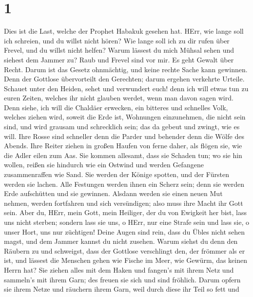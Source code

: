 \hypertarget{section}{%
\section{1}\label{section}}

 Dies ist die Last, welche der Prophet Habakuk gesehen hat.
 HErr, wie lange soll ich schreien, und du willst nicht
hören? Wie lange soll ich zu dir rufen über Frevel, und du willst nicht
helfen?  Warum lässest du mich Mühsal sehen und siehest dem
Jammer zu? Raub und Frevel sind vor mir. Es geht Gewalt über Recht.
 Darum ist das Gesetz ohnmächtig, und keine rechte Sache
kann gewinnen. Denn der Gottlose übervorteilt den Gerechten; darum
ergehen verkehrte Urteile.  Schauet unter den Heiden, sehet
und verwundert euch! denn ich will etwas tun zu euren Zeiten, welches
ihr nicht glauben werdet, wenn man davon sagen wird.  Denn
siehe, ich will die Chaldäer erwecken, ein bitteres und schnelles Volk,
welches ziehen wird, soweit die Erde ist, Wohnungen einzunehmen, die
nicht sein sind,  und wird grausam und schrecklich sein; das
da gebeut und zwingt, wie es will.  Ihre Rosse sind
schneller denn die Parder und behender denn die Wölfe des Abends. Ihre
Reiter ziehen in großen Haufen von ferne daher, als flögen sie, wie die
Adler eilen zum Aas.  Sie kommen allesamt, dass sie Schaden
tun; wo sie hin wollen, reißen sie hindurch wie ein Ostwind und werden
Gefangene zusammenraffen wie Sand.  Sie werden der Könige
spotten, und der Fürsten werden sie lachen. Alle Festungen werden ihnen
ein Scherz sein; denn sie werden Erde aufschütten und sie gewinnen.
 Alsdann werden sie einen neuen Mut nehmen, werden
fortfahren und sich versündigen; also muss ihre Macht ihr Gott sein.
 Aber du, HErr, mein Gott, mein Heiliger, der du von
Ewigkeit her bist, lass uns nicht sterben; sondern lass sie uns, o HErr,
nur eine Strafe sein und lass sie, o unser Hort, uns nur züchtigen!
 Deine Augen sind rein, dass du Übles nicht sehen magst,
und dem Jammer kannst du nicht zusehen. Warum siehst du denn den Räubern
zu und schweigst, dass der Gottlose verschlingt den, der frömmer als er
ist,  und lässest die Menschen gehen wie Fische im Meer,
wie Gewürm, das keinen Herrn hat?  Sie ziehen alles mit dem
Haken und fangen's mit ihrem Netz und sammeln's mit ihrem Garn; des
freuen sie sich und sind fröhlich.  Darum opfern sie ihrem
Netze und räuchern ihrem Garn, weil durch diese ihr Teil so fett und

